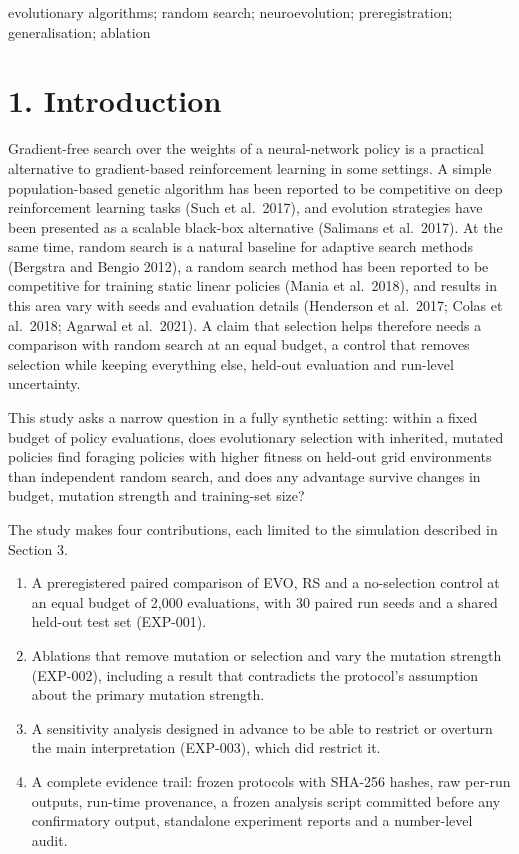 \documentclass[
]{article}
\providecommand{\tightlist}{%
  \setlength{\itemsep}{0pt}\setlength{\parskip}{0pt}}
\begin{document}
evolutionary algorithms; random search; neuroevolution; preregistration;
generalisation; ablation

\section{1. Introduction}\label{introduction}

Gradient-free search over the weights of a neural-network policy is a
practical alternative to gradient-based reinforcement learning in some
settings. A simple population-based genetic algorithm has been reported
to be competitive on deep reinforcement learning tasks (Such et
al.~2017), and evolution strategies have been presented as a scalable
black-box alternative (Salimans et al.~2017). At the same time, random
search is a natural baseline for adaptive search methods (Bergstra and
Bengio 2012), a random search method has been reported to be competitive
for training static linear policies (Mania et al.~2018), and results in
this area vary with seeds and evaluation details (Henderson et al.~2017;
Colas et al.~2018; Agarwal et al.~2021). A claim that selection helps
therefore needs a comparison with random search at an equal budget, a
control that removes selection while keeping everything else, held-out
evaluation and run-level uncertainty.

This study asks a narrow question in a fully synthetic setting: within a
fixed budget of policy evaluations, does evolutionary selection with
inherited, mutated policies find foraging policies with higher fitness
on held-out grid environments than independent random search, and does
any advantage survive changes in budget, mutation strength and
training-set size?

The study makes four contributions, each limited to the simulation
described in Section 3.

\begin{enumerate}
\def\labelenumi{\arabic{enumi}.}
\tightlist
\item
  A preregistered paired comparison of EVO, RS and a no-selection
  control at an equal budget of 2,000 evaluations, with 30 paired run
  seeds and a shared held-out test set (EXP-001).
\item
  Ablations that remove mutation or selection and vary the mutation
  strength (EXP-002), including a result that contradicts the protocol's
  assumption about the primary mutation strength.
\item
  A sensitivity analysis designed in advance to be able to restrict or
  overturn the main interpretation (EXP-003), which did restrict it.
\item
  A complete evidence trail: frozen protocols with SHA-256 hashes, raw
  per-run outputs, run-time provenance, a frozen analysis script
  committed before any confirmatory output, standalone experiment
  reports and a number-level audit.
\end{enumerate}
\end{document}
